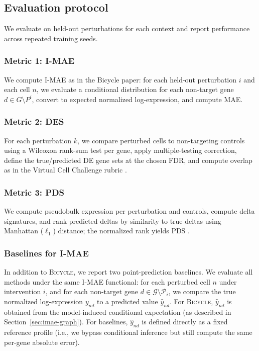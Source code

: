 \documentclass[12pt]{article}
\begin{document}
\subsection{Evaluation protocol}
We evaluate on held-out perturbations for each context and report performance across repeated training seeds.

\subsubsection{Metric 1: I-MAE}
We compute I-MAE as in the Bicycle paper: for each held-out perturbation \(i\) and each cell \(n\),
we evaluate a conditional distribution for each non-target gene \(d\in G\setminus P^i\), convert to
expected normalized log-expression, and compute MAE.

\subsubsection{Metric 2: DES}
For each perturbation \(k\), we compare perturbed cells to non-targeting controls using a Wilcoxon
rank-sum test per gene, apply multiple-testing correction, define the true/predicted DE gene
sets at the chosen FDR, and compute overlap as in the Virtual Cell Challenge rubric
\cite{virtualcellchallenge_eval}.

\subsubsection{Metric 3: PDS}
We compute pseudobulk expression per perturbation and controls, compute delta signatures, and
rank predicted deltas by similarity to true deltas using Manhattan (\(\ell_1\)) distance; the normalized
rank yields PDS \cite{virtualcellchallenge_eval}.

\subsubsection{Baselines for I-MAE}
\label{sec:baselines}
In addition to \textsc{Bicycle}, we report two point-prediction baselines. We evaluate all methods under the same I-MAE functional:
for each perturbed cell \(n\) under intervention \(i\), and for each non-target gene
\(d \in \mathcal{G}\setminus \mathcal{P}_i\), we compare the true normalized log-expression \(y_{nd}\)
to a predicted value \(\hat{y}_{nd}\).
For \textsc{Bicycle}, \(\hat{y}_{nd}\) is obtained from the model-induced conditional expectation
(as described in Section~\ref{sec:imae-graph}).
For baselines, \(\hat{y}_{nd}\) is defined directly as a fixed reference profile (i.e., we bypass conditional inference
but still compute the same per-gene absolute error).
\end{document}
